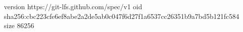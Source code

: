 version https://git-lfs.github.com/spec/v1
oid sha256:cbc223cfe6ef8abe2a2de5ab0c047f6d27f1a6537cc26351b9a7bd5b121fc584
size 86256
